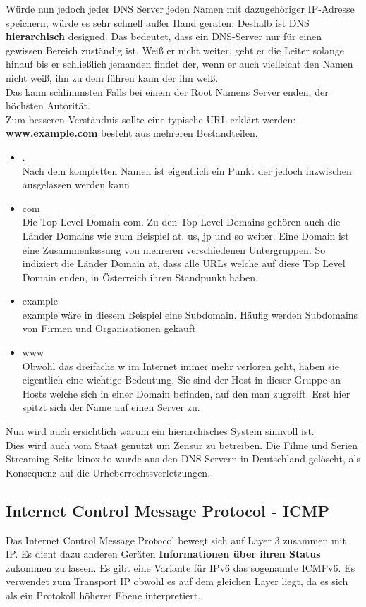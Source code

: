 \documentclass[12pt,a4paper]{report}
\begin{document}
Würde nun jedoch jeder DNS Server jeden Namen mit dazugehöriger IP-Adresse speichern, würde es sehr schnell außer Hand geraten. Deshalb ist DNS \textbf{hierarchisch} designed. Das bedeutet, dass ein DNS-Server nur für einen gewissen Bereich zuständig ist. Weiß er nicht weiter, geht er die Leiter solange hinauf bis er schließlich jemanden findet der, wenn er auch vielleicht den Namen nicht weiß, ihn zu dem führen kann der ihn weiß.\\
Das kann schlimmsten Falls bei einem der Root Namens Server enden, der höchsten Autorität.\\

Zum besseren Verständnis sollte eine typische URL erklärt werden:\\
\textbf{www.example.com} besteht aus mehreren Bestandteilen.
\begin{itemize}
\item .\\
Nach dem kompletten Namen ist eigentlich ein Punkt der jedoch inzwischen ausgelassen werden kann
\item com\\
Die Top Level Domain \glqq com\grqq . Zu den Top Level Domains gehören auch die Länder Domains wie zum Beispiel at, us, jp und so weiter. Eine Domain ist eine Zusammenfassung von mehreren verschiedenen Untergruppen. So indiziert die Länder Domain at, dass alle URLs welche auf diese Top Level Domain enden, in Österreich ihren Standpunkt haben.
\item example\\
example wäre in diesem Beispiel eine Subdomain. Häufig werden Subdomains von Firmen und Organisationen gekauft. 
\item www\\
Obwohl das dreifache w im Internet immer mehr verloren geht, haben sie eigentlich eine wichtige Bedeutung. Sie sind der Host in dieser Gruppe an Hosts welche sich in einer Domain befinden, auf den man zugreift. Erst hier spitzt sich der Name auf einen Server zu. 
\end{itemize}
Nun wird auch ersichtlich warum ein hierarchisches System sinnvoll ist.\\

Dies wird auch vom Staat genutzt um Zensur zu betreiben. Die Filme und Serien Streaming Seite kinox.to wurde aus den DNS Servern in Deutschland gelöscht, als Konsequenz auf die Urheberrechtsverletzungen.
\subsection{Internet Control Message Protocol - ICMP}
Das Internet Control Message Protocol bewegt sich auf Layer 3 zusammen mit IP. Es dient dazu anderen Geräten \textbf{Informationen über ihren Status} zukommen zu lassen. Es gibt eine Variante für IPv6 das sogenannte ICMPv6. Es verwendet zum Transport IP obwohl es auf dem gleichen Layer liegt, da es sich als ein Protokoll höherer Ebene interpretiert.\\
\end{document}
